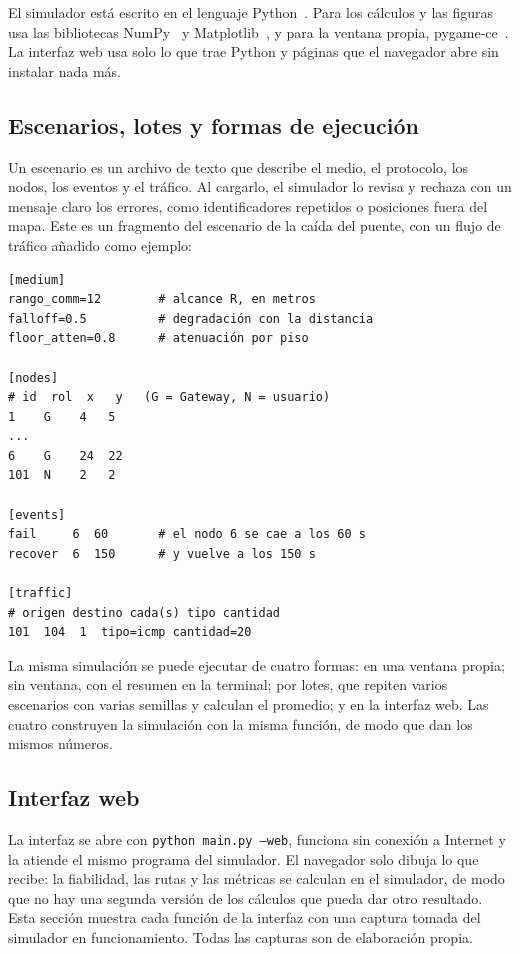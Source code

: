 El simulador está escrito en el lenguaje Python~\cite{Python}. Para los
cálculos y las figuras usa las bibliotecas NumPy~\cite{Harris2020Numpy} y
Matplotlib~\cite{Hunter2007Matplotlib}, y para la ventana propia,
pygame-ce~\cite{PygameCe}. La
interfaz web usa solo lo que trae Python y páginas que el navegador abre sin
instalar nada más.

\subsection{Escenarios, lotes y formas de ejecución}
\label{sec:ejecucion}

Un escenario es un archivo de texto que describe el medio, el protocolo, los
nodos, los eventos y el tráfico. Al cargarlo, el simulador lo revisa y rechaza
con un mensaje claro los errores, como identificadores repetidos o posiciones
fuera del mapa. Este es un fragmento del escenario de la caída del puente, con
un flujo de tráfico añadido como ejemplo:

\begin{verbatim}
[medium]
rango_comm=12        # alcance R, en metros
falloff=0.5          # degradación con la distancia
floor_atten=0.8      # atenuación por piso

[nodes]
# id  rol  x   y   (G = Gateway, N = usuario)
1    G    4   5
...
6    G    24  22
101  N    2   2

[events]
fail     6  60       # el nodo 6 se cae a los 60 s
recover  6  150      # y vuelve a los 150 s

[traffic]
# origen destino cada(s) tipo cantidad
101  104  1  tipo=icmp cantidad=20
\end{verbatim}

La misma simulación se puede ejecutar de cuatro formas: en una ventana propia;
sin ventana, con el resumen en la terminal; por lotes, que repiten varios
escenarios con varias semillas y calculan el promedio; y en la interfaz web.
Las cuatro construyen la simulación con la misma función, de modo que dan los
mismos números.

\subsection{Interfaz web}
\label{sec:interfaz}

La interfaz se abre con \texttt{python main.py --web}, funciona sin conexión a
Internet y la atiende el mismo programa del simulador. El navegador solo dibuja
lo que recibe: la fiabilidad, las rutas y las métricas se calculan en el
simulador, de modo que no hay una segunda versión de los cálculos que pueda dar
otro resultado. Esta sección muestra cada función de la interfaz con una
captura tomada del simulador en funcionamiento. Todas las capturas son de
elaboración propia.

